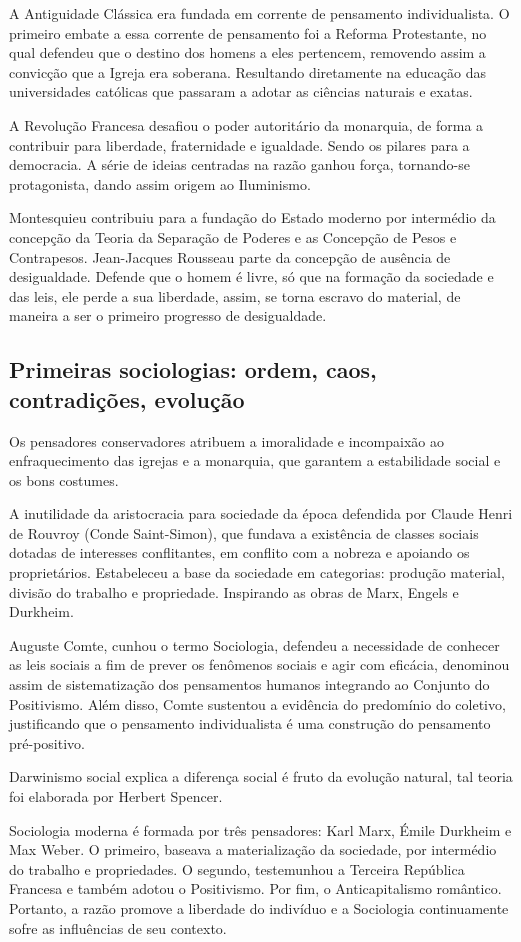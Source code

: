 A Antiguidade Clássica era fundada em corrente de pensamento individualista.
O primeiro embate a essa corrente de pensamento foi a Reforma Protestante, no qual defendeu que o destino dos homens a eles pertencem, removendo assim a convicção que a Igreja era soberana.
Resultando diretamente na educação das universidades católicas que passaram a adotar as ciências naturais e exatas.

A Revolução Francesa desafiou o poder autoritário da monarquia, de forma a contribuir para liberdade, fraternidade e igualdade.
Sendo os pilares para a democracia. 
A série de ideias centradas na razão ganhou força, tornando-se protagonista, dando assim origem ao Iluminismo. 

Montesquieu contribuiu para a fundação do Estado moderno por intermédio da concepção da Teoria da Separação de Poderes e as Concepção de Pesos e Contrapesos.
Jean-Jacques Rousseau parte da concepção de ausência de desigualdade.
Defende que o homem é livre, só que na formação da sociedade e das leis, ele perde a sua liberdade, assim, se torna escravo do material, de maneira a ser o primeiro progresso de desigualdade.

\subsection{Primeiras sociologias: ordem, caos, contradições, evolução}

Os pensadores conservadores atribuem a imoralidade e incompaixão ao enfraquecimento das igrejas e a monarquia, que garantem a estabilidade social e os bons costumes.

A inutilidade da aristocracia para sociedade da época defendida por Claude Henri de Rouvroy (Conde Saint-Simon), que fundava a existência de classes sociais dotadas de interesses conflitantes, em conflito com a nobreza e apoiando os proprietários.
Estabeleceu a base da sociedade em categorias: produção material, divisão do trabalho e propriedade.
Inspirando as obras de Marx, Engels e Durkheim.

Auguste Comte, cunhou o termo Sociologia, defendeu a necessidade de conhecer as leis sociais a fim de prever os fenômenos sociais e agir com eficácia, denominou assim de sistematização dos pensamentos humanos integrando ao Conjunto do Positivismo.
Além disso, Comte sustentou a evidência do predomínio do coletivo, justificando que o pensamento individualista é uma construção do pensamento pré-positivo.

Darwinismo social explica a diferença social é fruto da evolução natural, tal teoria foi elaborada por Herbert Spencer.

Sociologia moderna é formada por três pensadores: Karl Marx, Émile Durkheim e Max Weber. 
O primeiro, baseava a materialização da sociedade, por intermédio do trabalho e propriedades.
O segundo, testemunhou a Terceira República Francesa e também adotou o Positivismo. 
Por fim, o  Anticapitalismo romântico.
Portanto, a razão promove a liberdade do indivíduo e a Sociologia continuamente sofre as influências de seu contexto.
